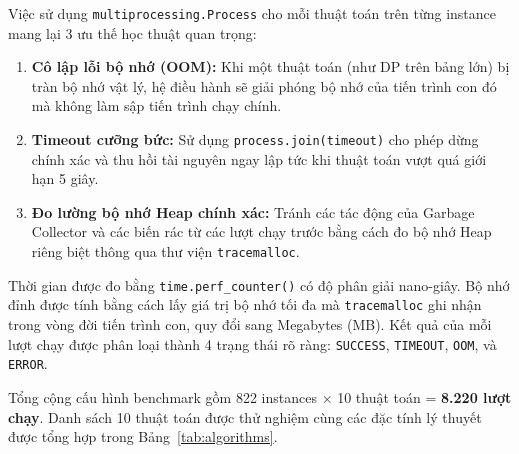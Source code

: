 \documentclass[fontsize=13pt,a4paper]{report}
\begin{document}
Việc sử dụng \texttt{multiprocessing.Process} cho mỗi thuật toán trên từng instance mang lại 3 ưu thế học thuật quan trọng:
\begin{enumerate}[leftmargin=*]
    \item \textbf{Cô lập lỗi bộ nhớ (OOM):} Khi một thuật toán (như DP trên bảng lớn) bị tràn bộ nhớ vật lý, hệ điều hành sẽ giải phóng bộ nhớ của tiến trình con đó mà không làm sập tiến trình chạy chính.
    \item \textbf{Timeout cưỡng bức:} Sử dụng \texttt{process.join(timeout)} cho phép dừng chính xác và thu hồi tài nguyên ngay lập tức khi thuật toán vượt quá giới hạn 5 giây.
    \item \textbf{Đo lường bộ nhớ Heap chính xác:} Tránh các tác động của Garbage Collector và các biến rác từ các lượt chạy trước bằng cách đo bộ nhớ Heap riêng biệt thông qua thư viện \texttt{tracemalloc}.
\end{enumerate}

Thời gian được đo bằng \texttt{time.perf\_counter()} có độ phân giải nano-giây. Bộ nhớ đỉnh được tính bằng cách lấy giá trị bộ nhớ tối đa mà \texttt{tracemalloc} ghi nhận trong vòng đời tiến trình con, quy đổi sang Megabytes (MB). Kết quả của mỗi lượt chạy được phân loại thành 4 trạng thái rõ ràng: \texttt{SUCCESS}, \texttt{TIMEOUT}, \texttt{OOM}, và \texttt{ERROR}.

Tổng cộng cấu hình benchmark gồm 822 instances $\times$ 10 thuật toán = \textbf{8.220 lượt chạy}. Danh sách 10 thuật toán được thử nghiệm cùng các đặc tính lý thuyết được tổng hợp trong Bảng~\ref{tab:algorithms}.
\end{document}
